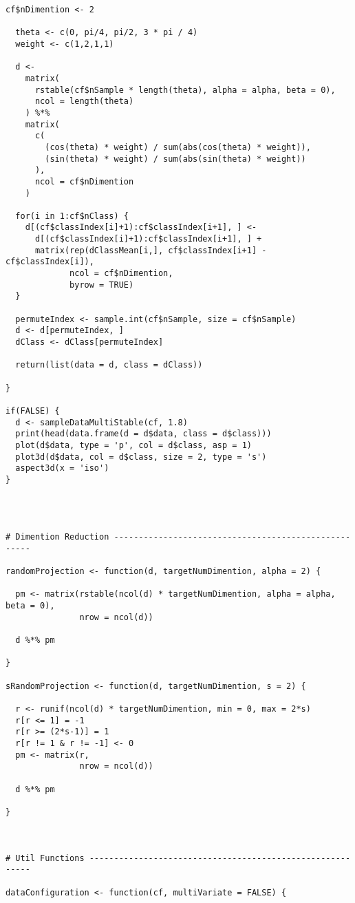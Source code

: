 \begin{latin}
\begin{Verbatim}[breaklines=true, breakanywhere=true, baselinestretch=1]
  cf$nDimention <- 2
  
  theta <- c(0, pi/4, pi/2, 3 * pi / 4)
  weight <- c(1,2,1,1)
  
  d <- 
    matrix(
      rstable(cf$nSample * length(theta), alpha = alpha, beta = 0),
      ncol = length(theta)
    ) %*%
    matrix(
      c(
        (cos(theta) * weight) / sum(abs(cos(theta) * weight)),
        (sin(theta) * weight) / sum(abs(sin(theta) * weight))
      ),
      ncol = cf$nDimention
    )
  
  for(i in 1:cf$nClass) {
    d[(cf$classIndex[i]+1):cf$classIndex[i+1], ] <- 
      d[(cf$classIndex[i]+1):cf$classIndex[i+1], ] +
      matrix(rep(dClassMean[i,], cf$classIndex[i+1] - cf$classIndex[i]), 
             ncol = cf$nDimention,
             byrow = TRUE)
  }
  
  permuteIndex <- sample.int(cf$nSample, size = cf$nSample)
  d <- d[permuteIndex, ]
  dClass <- dClass[permuteIndex]
  
  return(list(data = d, class = dClass))
  
}

if(FALSE) {
  d <- sampleDataMultiStable(cf, 1.8)
  print(head(data.frame(d = d$data, class = d$class)))
  plot(d$data, type = 'p', col = d$class, asp = 1)
  plot3d(d$data, col = d$class, size = 2, type = 's')
  aspect3d(x = 'iso')
}




# Dimention Reduction -----------------------------------------------------

randomProjection <- function(d, targetNumDimention, alpha = 2) {
  
  pm <- matrix(rstable(ncol(d) * targetNumDimention, alpha = alpha, beta = 0),
               nrow = ncol(d))
  
  d %*% pm
  
}

sRandomProjection <- function(d, targetNumDimention, s = 2) {
  
  r <- runif(ncol(d) * targetNumDimention, min = 0, max = 2*s)
  r[r <= 1] = -1
  r[r >= (2*s-1)] = 1
  r[r != 1 & r != -1] <- 0
  pm <- matrix(r,
               nrow = ncol(d))
  
  d %*% pm
  
}



# Util Functions ----------------------------------------------------------

dataConfiguration <- function(cf, multiVariate = FALSE) {
  

\end{Verbatim}
\end{latin}
